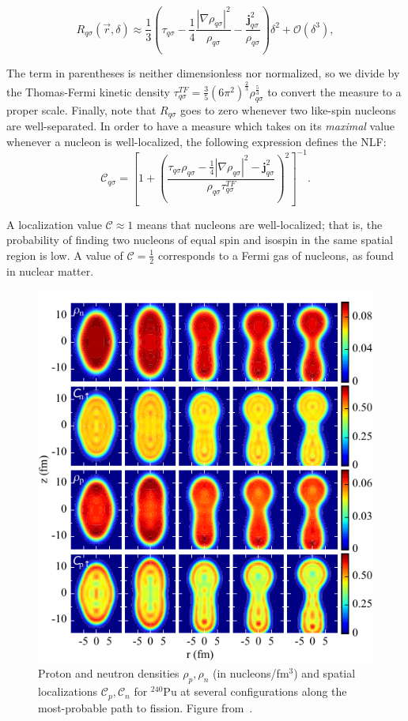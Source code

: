 \begin{equation}
	R_{q\sigma}(\vec{r},\delta) \approx \frac{1}{3} \left(\tau_{q\sigma}-\frac{1}{4}\frac{|\nabla\rho_{q\sigma}|^2}{\rho_{q\sigma}}-\frac{\mathbf{j}^2_{q\sigma}}{\rho_{q\sigma}}\right)\delta^2 + \mathcal{O}(\delta^3),
\end{equation}

\noindent The term in parentheses is neither dimensionless nor normalized, so we divide by the Thomas-Fermi kinetic density $\tau_{q\sigma}^{TF}=\frac{3}{5}(6\pi^2)^\frac{2}{3}\rho_{q\sigma}^\frac{5}{3}$ to convert the measure to a proper scale. Finally, note that $R_{q\sigma}$ goes to zero whenever two like-spin nucleons are well-separated. In order to have a measure which takes on its \textit{maximal} value whenever a nucleon is well-localized, the following expression defines the NLF:
\begin{equation}
\mathcal{C}_{q\sigma} = \left[1+\left(\frac{\tau_{q\sigma}\rho_{q\sigma}-\frac{1}{4}|\nabla\rho_{q\sigma}|^2-\mathbf{j}^2_{q\sigma}}{\rho_{q\sigma}\tau_{q\sigma}^{TF}}\right)^2\right]^{-1}.
\end{equation}

\noindent A localization value $\mathcal{C} \approx 1$ means that nucleons are well-localized; that is, the probability of finding two nucleons of equal spin and isospin in the same spatial region is low. A value of $\mathcal{C}=\frac{1}{2}$ corresponds to a Fermi gas of nucleons, as found in nuclear matter.

\begin{figure}
	\centering
	\includegraphics[width=0.5\linewidth]{TeX_files/methods_locali}
	\caption[Proton and neutron densities $\rho_p,\rho_n$ (in nucleons/fm$^3$) and spatial localizations $\mathcal{C}_p,\mathcal{C}_n$ for $^{240}$Pu at several configurations along the most-probable path to fission. Figure from~\cite{Zhang2016}.]{Proton and neutron densities $\rho_p,\rho_n$ (in nucleons/fm$^3$) and spatial localizations $\mathcal{C}_p,\mathcal{C}_n$ for $^{240}$Pu at several configurations along the most-probable path to fission. Figure from~\cite{Zhang2016}.}
	\label{fig:methodslocali}
\end{figure}

